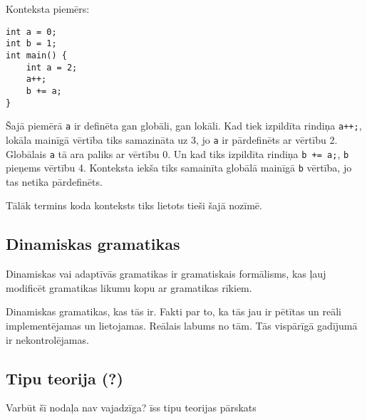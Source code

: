 Konteksta piemērs:
\begin{verbatim}
int a = 0;
int b = 1;
int main() {
    int a = 2;
    a++;
    b += a;
}
\end{verbatim}
Šajā piemērā \verb|a| ir definēta gan globāli, gan lokāli. Kad tiek izpildīta rindiņa \verb|a++;|, lokāla mainīgā vērtība tiks samazināta uz 3, jo \verb|a| ir pārdefinēts ar vērtību 2. Globālais \verb|a| tā ara paliks ar vērtību 0. Un kad tiks izpildīta rindiņa \verb|b += a;|, \verb|b| pieņems vērtību 4. Konteksta iekša tiks samainīta globālā mainīgā \verb|b| vērtība, jo tas netika pārdefinēts.

Tālāk termins koda konteksts tiks lietots tieši šajā nozīmē. 

\subsection{\label{subsec:dynamicgrammars}Dinamiskas gramatikas}
Dinamiskas vai adaptīvās gramatikas ir gramatiskais formālisms, kas ļauj modificēt gramatikas likumu kopu ar gramatikas rīkiem. \cite{Shutt:AdaptiveGrammars}

Dinamiskas gramatikas, kas tās ir. Fakti par to, ka tās jau ir pētītas un reāli implementējamas un lietojamas. Reālais labums no tām.
 Tās vispārīgā gadījumā ir nekontrolējamas.


\subsection{Tipu teorija (?)}
Varbūt šī nodaļa nav vajadzīga?
īss tipu teorijas pārskats